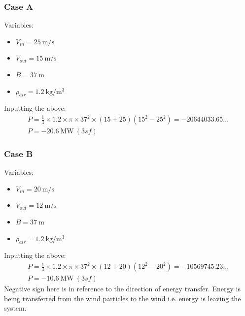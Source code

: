 \documentclass[12pt]{article}
\numberwithin{equation}{section}
\begin{document}
\begin{flushleft}
\subsubsection*{Case A}
Variables:
\begin{multicols}{2}
  \begin{itemize}
    \item $V_{in} = 25 \ \si{\meter\per\second}$
    \item $V_{out} = 15 \ \si{\meter\per\second}$
    \item $B = 37 \ \si{\meter}$
    \item $\rho_{air} = 1.2 \ \si{\kg\per\meter\cubed}$
  \end{itemize}
\end{multicols}
Inputting the above:
\begin{gather}
  P = \frac{1}{4} \times 1.2 \times \pi \times 37^2 \times (15 + 25)(15^2 - 25^2) = -20644033.65...\\
  P = -20.6 \ \si{\mega\watt} \ (3sf)
\end{gather}
\subsubsection*{Case B}
Variables:
\begin{multicols}{2}
  \begin{itemize}
    \item $V_{in} = 20 \ \si{\meter\per\second}$
    \item $V_{out} = 12 \ \si{\meter\per\second}$
    \item $B = 37 \ \si{\meter}$
    \item $\rho_{air} = 1.2 \ \si{\kg\per\meter\cubed}$
  \end{itemize}
\end{multicols}
Inputting the above:
\begin{gather}
  P = \frac{1}{4} \times 1.2 \times \pi \times 37^2 \times (12 + 20)(12^2 - 20^2) = -10569745.23...\\
  P = -10.6 \ \si{\mega\watt} \ (3sf)
\end{gather}
Negative sign here is in reference to the direction of energy transfer. Energy is being transferred from the wind particles to the wind i.e. energy is leaving the system. 


\end{flushleft}
\end{document}
